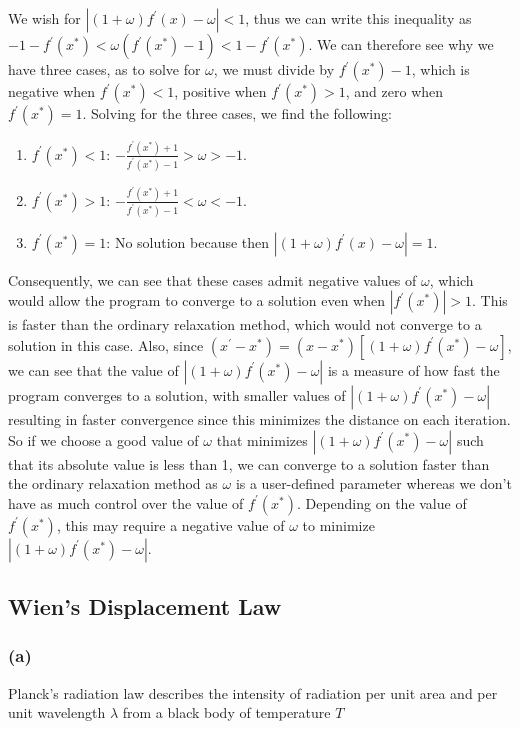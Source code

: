 \documentclass[a4paper,11pt]{article}
\begin{document}
We wish for $|(1 + \omega) f^\prime(x) - \omega|<1$, thus we can write this inequality as $-1-f^\prime(x^*)<\omega(f^\prime(x^*)-1)<1-f^\prime(x^*)$. We can therefore see why we have three cases, as to solve for $\omega$, we must divide by $f^\prime(x^*)-1$, which is negative when $f^\prime(x^*)<1$, positive when $f^\prime(x^*)>1$, and zero when $f^\prime(x^*)=1$. Solving for the three cases, we find the following:

\begin{enumerate}
\item{$f^\prime(x^*)<1$:} $ - \frac{f^\prime(x^*) + 1}{f^\prime(x^*) - 1}> \omega > -1$.
\item{$f^\prime(x^*)>1$:} $- \frac{f^\prime(x^*)+1}{f^\prime(x^*)-1} < \omega < -1$.
\item{$f^\prime(x^*)=1$:} No solution because then $|(1 + \omega) f^\prime(x) - \omega| = 1$.
\end{enumerate}

Consequently, we can see that these cases admit negative values of $\omega$, which would allow the program to converge to a solution even when $|f^\prime(x^*)|>1$. This is faster than the ordinary relaxation method, which would not converge to a solution in this case. Also, since $(x^\prime - x^*) = (x - x^*) [(1+\omega)f^\prime(x^*) - \omega]$, we can see that the value of $|(1+\omega)f^\prime(x^*) - \omega|$ is a measure of how fast the program converges to a solution, with smaller values of $|(1+\omega)f^\prime(x^*) - \omega|$ resulting in faster convergence since this minimizes the distance on each iteration. So if we choose a good value of $\omega$ that minimizes $|(1+\omega)f^\prime(x^*) - \omega|$ such that its absolute value is less than 1, we can converge to a solution faster than the ordinary relaxation method as $\omega$ is a user-defined parameter whereas we don't have as much control over the value of $f^\prime(x^*)$. Depending on the value of $f^\prime(x^*)$, this may require a negative value of $\omega$ to minimize $|(1+\omega)f^\prime(x^*) - \omega|$.


\subsection*{Wien's Displacement Law}

\subsubsection*{(a)}  Planck's radiation law describes the intensity of radiation per unit area and per unit wavelength $\lambda$ from a black body of temperature $T$
\end{document}
